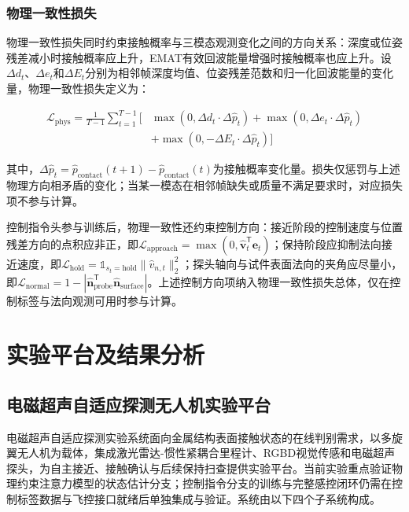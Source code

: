 \subsubsection{物理一致性损失}

物理一致性损失同时约束接触概率与三模态观测变化之间的方向关系：深度或位姿残差减小时接触概率应上升，EMAT有效回波能量增强时接触概率也应上升。设$\Delta d_t$、$\Delta e_t$和$\Delta E_t$分别为相邻帧深度均值、位姿残差范数和归一化回波能量的变化量，物理一致性损失定义为：

\begin{equation}
\begin{aligned}
\mathcal{L}_{\text{phys}} = \frac{1}{T-1} \sum_{t=1}^{T-1} \big[&\max\left(0, \Delta d_t \cdot \Delta \hat{p}_t\right) + \max\left(0, \Delta e_t \cdot \Delta \hat{p}_t\right) \\
&+ \max\left(0, -\Delta E_t \cdot \Delta \hat{p}_t\right)\big]
\end{aligned}
\label{eq:phys_loss}
\end{equation}

其中，$\Delta \hat{p}_t=\hat{p}_{\text{contact}}(t+1)-\hat{p}_{\text{contact}}(t)$为接触概率变化量。损失仅惩罚与上述物理方向相矛盾的变化；当某一模态在相邻帧缺失或质量不满足要求时，对应损失项不参与计算。

控制指令头参与训练后，物理一致性还约束控制方向：接近阶段的控制速度与位置残差方向的点积应非正，即$\mathcal{L}_{\text{approach}} = \max\left(0, \hat{\mathbf{v}}_t^{\mathsf{T}}\mathbf{e}_t\right)$；保持阶段应抑制法向接近速度，即$\mathcal{L}_{\text{hold}} = \mathbb{1}_{s_t=\mathrm{hold}}\|\hat{v}_{n,t}\|_2^2$；探头轴向与试件表面法向的夹角应尽量小，即$\mathcal{L}_{\text{normal}} = 1 - |\hat{\mathbf{n}}_{\mathrm{probe}}^{\mathsf{T}}\hat{\mathbf{n}}_{\mathrm{surface}}|$。上述控制方向项纳入物理一致性损失总体，仅在控制标签与法向观测可用时参与计算。

\section{实验平台及结果分析}

\subsection{电磁超声自适应探测无人机实验平台}

电磁超声自适应探测实验系统面向金属结构表面接触状态的在线判别需求，以多旋翼无人机为载体，集成激光雷达-惯性紧耦合里程计、RGBD视觉传感和电磁超声探头，为自主接近、接触确认与后续保持扫查提供实验平台。当前实验重点验证物理约束注意力模型的状态估计分支；控制指令分支的训练与完整感控闭环仍需在控制标签数据与飞控接口就绪后单独集成与验证。系统由以下四个子系统构成。

